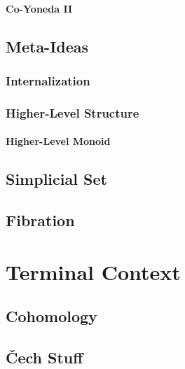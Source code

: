 \documentclass[a4paper,11pt,psamsfonts,reqno]{amsbook}
\newcounter{prpcounter}
\theoremstyle{proposition}
\theoremstyle{proof}
\begin{document}
\subsubsection{Co-Yoneda II}
\label{sec:coyoneda2}



\section{Meta-Ideas}
\label{sec:metaidea}


\subsection{Internalization}
\label{sec:internaliz}


\subsection{Higher-Level Structure}
\label{sec:hls}

\subsubsection{Higher-Level Monoid}
\label{sec:hlm}



\section{Simplicial Set}
\label{sec:sset}



\section{Fibration}
\label{sec:fibration}




\chapter{Terminal Context}
\label{chap:termcontext}



\section{Cohomology}
\label{sec:cohomology}



\section{\v{C}ech Stuff}
\label{sec:check}

\end{document}
